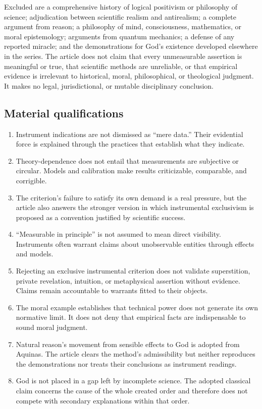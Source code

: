 Excluded are a comprehensive history of logical positivism or philosophy of science; adjudication between scientific realism and antirealism; a complete argument from reason; a philosophy of mind, consciousness, mathematics, or moral epistemology; arguments from quantum mechanics; a defense of any reported miracle; and the demonstrations for God's existence developed elsewhere in the series. The article does not claim that every unmeasurable assertion is meaningful or true, that scientific methods are unreliable, or that empirical evidence is irrelevant to historical, moral, philosophical, or theological judgment. It makes no legal, jurisdictional, or mutable disciplinary conclusion.

\subsection{Material qualifications}

\begin{enumerate}[leftmargin=1.45em,itemsep=0.25em]
\item Instrument indications are not dismissed as ``mere data.'' Their evidential force is explained through the practices that establish what they indicate.
\item Theory-dependence does not entail that measurements are subjective or circular. Models and calibration make results criticizable, comparable, and corrigible.
\item The criterion's failure to satisfy its own demand is a real pressure, but the article also answers the stronger version in which instrumental exclusivism is proposed as a convention justified by scientific success.
\item ``Measurable in principle'' is not assumed to mean direct visibility. Instruments often warrant claims about unobservable entities through effects and models.
\item Rejecting an exclusive instrumental criterion does not validate superstition, private revelation, intuition, or metaphysical assertion without evidence. Claims remain accountable to warrants fitted to their objects.
\item The moral example establishes that technical power does not generate its own normative limit. It does not deny that empirical facts are indispensable to sound moral judgment.
\item Natural reason's movement from sensible effects to God is adopted from Aquinas. The article clears the method's admissibility but neither reproduces the demonstrations nor treats their conclusions as instrument readings.
\item God is not placed in a gap left by incomplete science. The adopted classical claim concerns the cause of the whole created order and therefore does not compete with secondary explanations within that order.
\end{enumerate}

